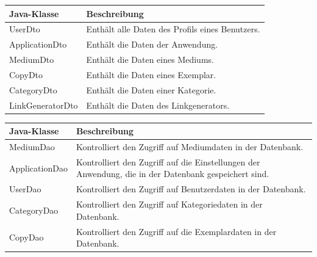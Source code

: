 \documentclass{article}
\begin{document}
\begin{center}
    \begin{table}
        \begin{tabular} { |p{}|p{}| } 
            \hline          
            Java-Klasse & Beschreibung  \\
             \hline\hline
            UserDto & Enthält alle Daten des Profils eines Benutzers. \\
            ApplicationDto & Enthält die Daten der Anwendung. \\
            \hline
            MediumDto & Enthält die Daten eines Mediums. \\
            \hline
            CopyDto & Enthält die   Daten eines Exemplar. \\
            \hline
            CategoryDto & Enthält die Daten einer Kategorie. \\
            \hline
            LinkGeneratorDto & Enthält die Daten des Linkgenerators. \\
            \hline
        \end{tabular}
        \end{table}
        \end{center}
       

  \begin{center}
    \begin{table}
        \begin{tabular} { |p{}|p{}| }
             \hline
            Java-Klasse & Beschreibung \\
            \hline\hline
            MediumDao & Kontrolliert den Zugriff auf Mediumdaten in der Datenbank. \\
             \hline
            ApplicationDao & Kontrolliert den Zugriff auf die Einstellungen der Anwendung, die in der Datenbank gespeichert sind. \\
            \hline
            UserDao & Kontrolliert den Zugriff auf Benutzerdaten in der Datenbank. \\
            \hline
            CategoryDao & Kontrolliert den Zugriff auf Kategoriedaten in der Datenbank. \\
            \hline
            CopyDao & Kontrolliert den Zugriff auf die Exemplardaten in der Datenbank. \\
            \hline
        \end{tabular}
        \end{table}
        \end{center}
        
\end{document}
